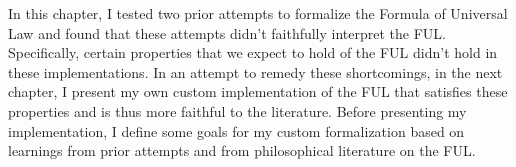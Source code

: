 %
\begin{isabellebody}%
%
%
\isadelimtheory
%
\endisadelimtheory
%
\isatagtheory
%
\endisatagtheory
{\isafoldtheory}%
%
\isadelimtheory
%
\endisadelimtheory
%
\isadelimdocument
%
\endisadelimdocument
%
\isatagdocument
%
\isamarkuptrue%
%
\endisatagdocument
{\isafolddocument}%
%
\isadelimdocument
%
\endisadelimdocument
%
\begin{isamarkuptext}%
In this chapter, I tested two prior attempts to formalize the Formula of Universal Law and found 
that these attempts didn't faithfully interpret the FUL. Specifically, certain properties that 
we expect to hold of the FUL didn't hold in these implementations. In an attempt to remedy these 
shortcomings, in the next chapter, I present my own custom implementation of the FUL that satisfies these properties
and is thus more faithful to the literature. Before presenting my 
implementation, I define some goals for my custom formalization based on learnings from prior
attempts and from philosophical literature on the FUL.


\end{isamarkuptext}
\end{isabellebody}
